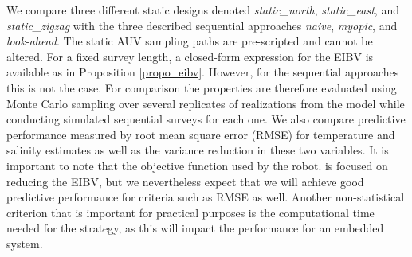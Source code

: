 \documentclass[aoas]{imsart}
\begin{document}
We compare three different static designs denoted
\textit{static\_north}, \textit{static\_east}, and
\textit{static\_zigzag} with the three described sequential approaches
\textit{naive}, \textit{myopic}, and \textit{look-ahead}. The static
AUV sampling paths are pre-scripted and cannot be altered.
For a fixed survey length, a closed-form expression for the EIBV is
available as in Proposition \ref{propo_eibv}. However, for the sequential
approaches this is not the case. For comparison the properties are
therefore evaluated using Monte Carlo sampling over several replicates
of realizations from the model while conducting simulated sequential
surveys for each one. We also compare predictive
performance measured by root mean square error (RMSE) for temperature
and salinity estimates as well as the variance reduction in these
two variables. It is important to note that the objective function
used by the robot. is focused on reducing the
EIBV, but we nevertheless expect that we will achieve good predictive
performance for criteria such as RMSE as well. Another non-statistical
criterion that is important for practical purposes is the computational
time needed for the strategy, as this will impact the performance for
an embedded system.

\end{document}
